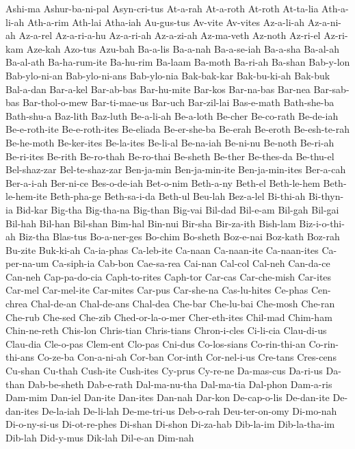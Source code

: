 {  Ashi-ma Ashur-ba-ni-pal Asyn-cri-tus At-a-rah At-a-roth At-roth
  At-ta-lia Ath-a-li-ah Ath-a-rim Ath-lai Atha-iah Au-gus-tus
  Av-vite Av-vites Az-a-li-ah Az-a-ni-ah Az-a-rel Az-a-ri-a-hu
  Az-a-ri-ah Az-a-zi-ah Az-ma-veth Az-noth Az-ri-el Az-ri-kam
  Aze-kah Azo-tus Azu-bah Ba-a-lis Ba-a-nah Ba-a-se-iah
  Ba-a-sha Ba-al-ah Ba-al-ath Ba-ha-rum-ite Ba-hu-rim Ba-laam
  Ba-moth Ba-ri-ah Ba-shan Bab-y-lon Bab-ylo-ni-an Bab-ylo-ni-ans
  Bab-ylo-nia Bak-bak-kar Bak-bu-ki-ah Bak-buk Bal-a-dan Bar-a-kel
  Bar-ab-bas Bar-hu-mite Bar-kos Bar-na-bas Bar-nea Bar-sab-bas
  Bar-thol-o-mew Bar-ti-mae-us Bar-uch Bar-zil-lai Bas-e-math Bath-she-ba
  Bath-shu-a Baz-lith Baz-luth Be-a-li-ah Be-a-loth Be-cher
  Be-co-rath Be-de-iah Be-e-roth-ite Be-e-roth-ites Be-eliada Be-er-she-ba
  Be-erah Be-eroth Be-esh-te-rah Be-he-moth Be-ker-ites Be-la-ites
  Be-li-al Be-na-iah Be-ni-nu Be-noth Be-ri-ah Be-ri-ites
  Be-rith Be-ro-thah Be-ro-thai Be-sheth Be-ther Be-thes-da
  Be-thu-el Bel-shaz-zar Bel-te-shaz-zar Ben-ja-min Ben-ja-min-ite Ben-ja-min-ites
  Ber-a-cah Ber-a-i-ah Ber-ni-ce Bes-o-de-iah Bet-o-nim Beth-a-ny
  Beth-el Beth-le-hem Beth-le-hem-ite Beth-pha-ge Beth-sa-i-da Beth-ul
  Beu-lah Bez-a-lel Bi-thi-ah Bi-thyn-ia Bid-kar Big-tha
  Big-tha-na Big-than Big-vai Bil-dad Bil-e-am Bil-gah
  Bil-gai Bil-hah Bil-han Bil-shan Bim-hal Bin-nui
  Bir-sha Bir-za-ith Bish-lam Biz-i-o-thi-ah Biz-tha Blas-tus
  Bo-a-ner-ges Bo-chim Bo-sheth Boz-e-nai Boz-kath Boz-rah
  Bu-zite Buk-ki-ah Ca-ia-phas Ca-leb-ite Ca-naan Ca-naan-ite
  Ca-naan-ites Ca-per-na-um Ca-siph-ia Cab-bon Cae-sa-rea Cai-nan
  Cal-col Cal-neh Can-da-ce Can-neh Cap-pa-do-cia Caph-to-rites
  Caph-tor Car-cas Car-che-mish Car-ites Car-mel Car-mel-ite
  Car-mites Car-pus Car-she-na Cas-lu-hites Ce-phas Cen-chrea
  Chal-de-an Chal-de-ans Chal-dea Che-bar Che-lu-bai Che-mosh
  Che-ran Che-rub Che-sed Che-zib Ched-or-la-o-mer Cher-eth-ites
  Chil-mad Chim-ham Chin-ne-reth Chis-lon Chris-tian Chris-tians
  Chron-i-cles Ci-li-cia Clau-di-us Clau-dia Cle-o-pas Clem-ent
  Clo-pas Cni-dus Co-los-sians Co-rin-thi-an Co-rin-thi-ans Co-ze-ba
  Con-a-ni-ah Cor-ban Cor-inth Cor-nel-i-us Cre-tans Cres-cens
  Cu-shan Cu-thah Cush-ite Cush-ites Cy-prus Cy-re-ne
  Da-mas-cus Da-ri-us Da-than Dab-be-sheth Dab-e-rath Dal-ma-nu-tha
  Dal-ma-tia Dal-phon Dam-a-ris Dam-mim Dan-iel Dan-ite
  Dan-ites Dan-nah Dar-kon De-cap-o-lis De-dan-ite De-dan-ites
  De-la-iah De-li-lah De-me-tri-us Deb-o-rah Deu-ter-on-omy Di-mo-nah
  Di-o-ny-si-us Di-ot-re-phes Di-shan Di-shon Di-za-hab Dib-la-im
  Dib-la-tha-im Dib-lah Did-y-mus Dik-lah Dil-e-an Dim-nah
}
